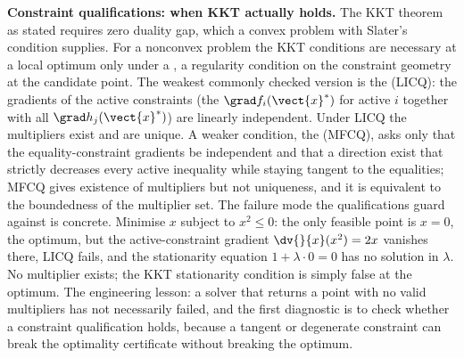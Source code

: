\begin{mastery}
\textbf{Constraint qualifications: when KKT actually holds.} The
KKT theorem as stated requires zero duality gap, which a convex
problem with Slater's condition supplies. For a nonconvex problem
the KKT conditions are necessary at a local optimum only under a
, a regularity condition on the
constraint geometry at the candidate point. The weakest commonly
checked version is the  (LICQ): the gradients of the active constraints
(the $\grad f_{i}(\vect{x}^{*})$ for active $i$ together with all
$\grad h_{j}(\vect{x}^{*})$) are linearly independent. Under LICQ
the multipliers exist and are unique. A weaker condition, the
 (MFCQ),
asks only that the equality-constraint gradients be independent and
that a direction exist that strictly decreases every active
inequality while staying tangent to the equalities; MFCQ gives
existence of multipliers but not uniqueness, and it is equivalent
to the boundedness of the multiplier set. The failure mode the
qualifications guard against is concrete. Minimise $x$ subject to
$x^{2} \leq 0$: the only feasible point is $x = 0$, the optimum,
but the active-constraint gradient $\dv{}{x}(x^{2}) = 2x$ vanishes
there, LICQ fails, and the stationarity equation $1 + \lambda \cdot
0 = 0$ has no solution in $\lambda$. No multiplier exists; the KKT
stationarity condition is simply false at the optimum. The
engineering lesson: a solver that returns a point with no valid
multipliers has not necessarily failed, and the first diagnostic is
to check whether a constraint qualification holds, because a
tangent or degenerate constraint can break the optimality
certificate without breaking the optimum.
\end{mastery}

